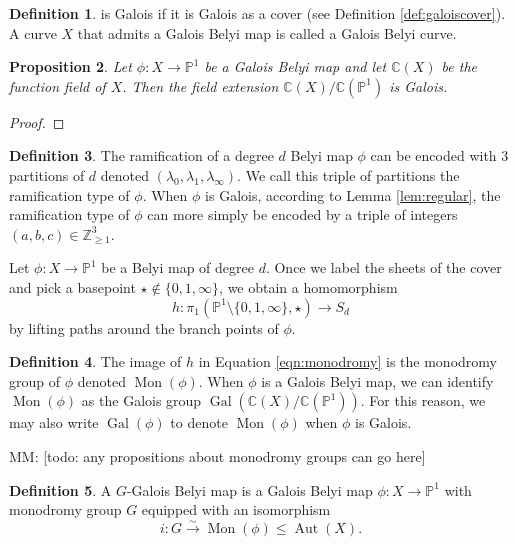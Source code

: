 \documentclass{dcthesis}
\newcommand{\PP}{\mathbb P}
\newcommand{\CC}{\mathbb C}
\newcommand{\ZZ}{\mathbb Z}
\newcommand{\defi}[1]{\textsf{#1}}
\newcommand{\mm}[1]{{\color{blue} \sf MM: [#1]}}
\DeclareMathOperator{\Aut}{Aut}
\DeclareMathOperator{\Mon}{Mon}
\DeclareMathOperator{\Gal}{Gal}
\newtheorem{prop}{Proposition}[section]
\theoremstyle{definition}
\newtheorem{definition}[prop]{Definition}
\theoremstyle{remark}
\numberwithin{equation}{section}
\numberwithin{figure}{section}
\begin{document}
{{\begin{definition}
      is \defi{Galois}
      if it is Galois as a cover
      (see Definition \ref{def:galoiscover}).
      A curve $X$ that admits a Galois Belyi map
      is called a \defi{Galois Belyi curve}.
    \end{definition}
    \begin{prop}\label{prop:galoiscover}
      Let $\phi\colon X\to\PP^1$ be a Galois Belyi map
      and let $\CC(X)$ be the function field of $X$.
      Then the field extension
      $\CC(X)/\CC(\PP^1)$ is Galois.
    \end{prop}
    \begin{proof}
    \end{proof}
    \begin{definition}\label{def:ramificationtype}
      The ramification
      of a degree $d$ Belyi map $\phi$
      can be encoded with $3$ partitions of $d$
      denoted $(\lambda_0,\lambda_1,\lambda_\infty)$.
      We call this triple of partitions
      the \defi{ramification type} of $\phi$.
      When $\phi$ is Galois,
      according to Lemma \ref{lem:regular},
      the ramification type of $\phi$ can more simply be encoded by
      a triple of integers $(a,b,c)\in\ZZ_{\geq 1}^3$.
    \end{definition}
    Let $\phi\colon X\to\PP^1$ be a Belyi map of degree $d$.
    Once we label the sheets of the cover
    and pick a basepoint $\star\not\in\{0,1,\infty\}$,
    we obtain a homomorphism
    \begin{equation}\label{eqn:monodromy}
      h\colon\pi_1(\PP^1\setminus\{0,1,\infty\},\star)\to S_d
    \end{equation}
    by lifting paths around the branch points of $\phi$.
    \begin{definition}\label{def:monodromy}
      The image of $h$ in Equation \ref{eqn:monodromy}
      is the \defi{monodromy group} of $\phi$
      denoted $\Mon(\phi)$.
      When $\phi$ is a Galois Belyi map,
      we can identify $\Mon(\phi)$
      as the Galois group
      $\Gal(\CC(X)/\CC(\PP^1))$.
      For this reason,
      we may also write $\Gal(\phi)$
      to denote $\Mon(\phi)$ when $\phi$
      is Galois.
    \end{definition}
    \mm{todo: any propositions about monodromy groups can go here}
    \begin{definition}\label{def:Gbelyi}
      A \defi{$G$-Galois Belyi map}
      is a Galois Belyi map
      $\phi\colon X\to\PP^1$
      with monodromy group $G$
      equipped with an isomorphism
      \[
        i\colon G\stackrel{\sim}{\to}\Mon(\phi)\leq\Aut(X).
\]
\end{definition}}}
\end{document}
